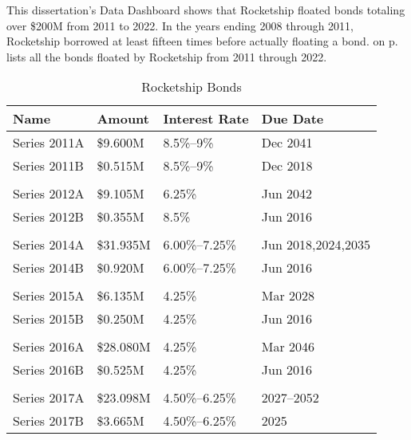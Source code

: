 This dissertation's Data Dashboard shows that Rocketship floated bonds totaling over \$200M from 2011 to 2022. In the years ending 2008 through 2011, Rocketship borrowed at least fifteen times before actually floating a bond.  on p.\pageref{tab:rocketship_bonds} lists all the bonds floated by Rocketship from 2011 through 2022.

\begin{table}[ht]
  \SingleSpacing
  \caption{Rocketship Bonds}\label{tab:rocketship_bonds}%
  \begin{tabular}{llll}
    \toprule
    Name             & Amount    & Interest Rate  & Due Date           \\
    \midrule
    Series 2011A     & \$9.600M  & 8.5\%–9\%      & Dec 2041           \\
    Series 2011B     & \$0.515M  & 8.5\%–9\%      & Dec 2018           \\
                                                                       \\
    Series 2012A     & \$9.105M  & 6.25\%         & Jun 2042           \\
    Series 2012B     & \$0.355M  & 8.5\%          & Jun 2016           \\
                                                                       \\
    Series 2014A     & \$31.935M & 6.00\%–7.25\%  & Jun 2018,2024,2035 \\
    Series 2014B     & \$0.920M  & 6.00\%–7.25\%  & Jun 2016           \\
                                                                       \\
    Series 2015A     & \$6.135M  & 4.25\%         & Mar 2028           \\
    Series 2015B     & \$0.250M  & 4.25\%         & Jun 2016           \\
                                                                       \\
    Series 2016A     & \$28.080M & 4.25\%         & Mar 2046           \\
    Series 2016B     & \$0.525M  & 4.25\%         & Jun 2016           \\
                                                                       \\
    Series 2017A     & \$23.098M & 4.50\%–6.25\%  & 2027–2052          \\
    Series 2017B     & \$3.665M  & 4.50\%–6.25\%  & 2025               \\

\end{tabular}
\end{table}
